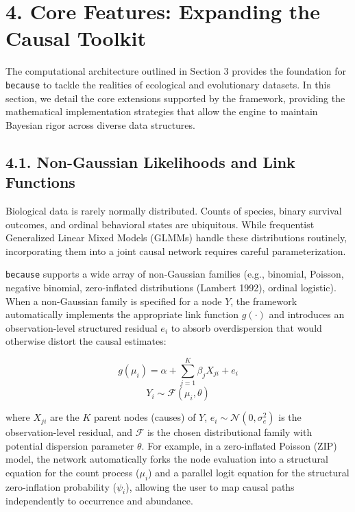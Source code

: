 \documentclass[
]{article}
\begin{document}
\section{4. Core Features: Expanding the Causal Toolkit}\label{core-features-expanding-the-causal-toolkit}

The computational architecture outlined in Section 3 provides the foundation for \texttt{because} to tackle the realities of ecological and evolutionary datasets. In this section, we detail the core extensions supported by the framework, providing the mathematical implementation strategies that allow the engine to maintain Bayesian rigor across diverse data structures.

\subsection{4.1. Non-Gaussian Likelihoods and Link Functions}\label{non-gaussian-likelihoods-and-link-functions}

Biological data is rarely normally distributed. Counts of species, binary survival outcomes, and ordinal behavioral states are ubiquitous. While frequentist Generalized Linear Mixed Models (GLMMs) handle these distributions routinely, incorporating them into a joint causal network requires careful parameterization.

\texttt{because} supports a wide array of non-Gaussian families (e.g., binomial, Poisson, negative binomial, zero-inflated distributions (Lambert 1992), ordinal logistic). When a non-Gaussian family is specified for a node \(Y\), the framework automatically implements the appropriate link function \(g(\cdot)\) and introduces an observation-level structured residual \(e_i\) to absorb overdispersion that would otherwise distort the causal estimates:

\[ g(\mu_i) = \alpha + \sum_{j=1}^{K} \beta_j X_{ji} + e_i \]
\[ Y_i \sim \mathcal{F}(\mu_i, \theta) \]

where \(X_{ji}\) are the \(K\) parent nodes (causes) of \(Y\), \(e_i \sim \mathcal{N}(0, \sigma^2_e)\) is the observation-level residual, and \(\mathcal{F}\) is the chosen distributional family with potential dispersion parameter \(\theta\). For example, in a zero-inflated Poisson (ZIP) model, the network automatically forks the node evaluation into a structural equation for the count process (\(\mu_i\)) and a parallel logit equation for the structural zero-inflation probability (\(\psi_i\)), allowing the user to map causal paths independently to occurrence and abundance.
\end{document}
